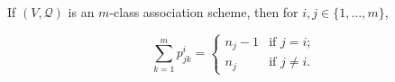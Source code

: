 If $(V, \mathcal{Q})$ is an $m$-class association scheme, then for $i, j \in \{1, \ldots, m\}$,

$$\sum_{k=1}^{m} p_{jk}^i = \begin{cases} n_j - 1 & \text{if } j = i; \\ n_j & \text{if } j \neq i. \end{cases}$$

